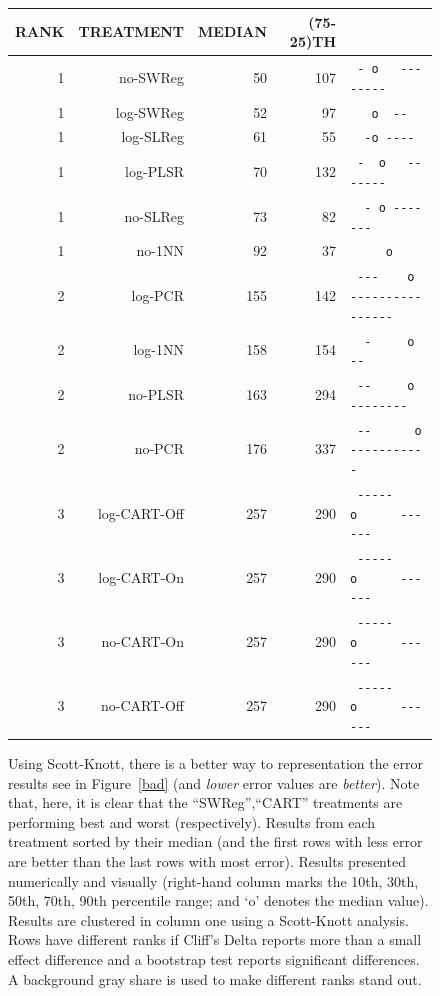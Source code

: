 \documentclass[10pt]{elsarticle}
\begin{document}
\begin{figure}
 {\scriptsize \begin{center} 
\begin{tabular}{rrrrl}
RANK  &    TREATMENT &MEDIAN & (75-25)TH\\\hline

   1  &    no-SWReg  &    50&      107 &  \verb+ - o   --------                + \\
   1  &   log-SWReg  &    52&       97 &  \verb+   o  --                       + \\
   1   &  log-SLReg  &    61 &      55 &  \verb+  -o ----                      + \\
   1   &   log-PLSR  &    70 &     132 &  \verb+ -  o   -------                + \\
   1  &    no-SLReg  &    73  &     82 &  \verb+  - o -------                  + \\
   1   &     no-1NN  &    92  &    37  &  \verb+     o                         +\\ \rowcolor{gray} 
  2   &    log-PCR  &   155   &   142  &  \verb+ ---    o ----------------     + \\\rowcolor{gray} 
   2   &    log-1NN  &   158  &    154 &  \verb+  -     o --                   +\\ \rowcolor{gray} 
  2   &    no-PLSR  &   163   &   294 &  \verb+ --     o        --------      + \\\rowcolor{gray} 
   2  &      no-PCR   &  176   &   337 &  \verb+ --      o         ----------- + \\
   3  &log-CART-Off   &  257   &   290 &  \verb+ -----      o      ------      + \\
   3 &  log-CART-On   &  257   &   290 &  \verb+ -----      o      ------      + \\
   3 &   no-CART-On  &  257    &  290  &  \verb+ -----      o      ------      + \\
   3  & no-CART-Off   &  257   &   290 &  \verb+ -----      o      ------      +\\  
\end{tabular} 
 
 \end{center}
}
\caption{Using Scott-Knott, there is a better way to  representation  the error results see in  Figure~\ref{bad} (and  {\em lower}
error
values are {\em better}). Note that, here, it is clear that the ``SWReg'',``CART'' treatments are performing best and worst (respectively). Results from each treatment sorted by their median (and the first rows with less error are better than the last rows
with most error). Results presented numerically and visually (right-hand column marks the 10th, 30th, 50th, 70th, 90th percentile range; and `o' denotes the median value).
Results  are clustered in column one using a Scott-Knott analysis.  Rows have different ranks if Cliff's Delta reports more than a small effect difference and a bootstrap test reports significant differences.  A background gray share is used to make different ranks stand out. 
}\label{fig:sk}
\end{figure}
\end{document}
